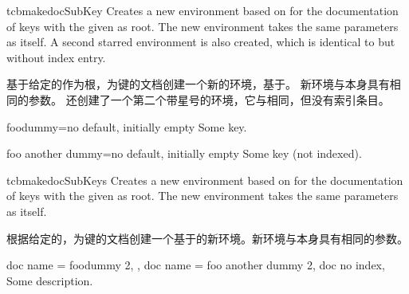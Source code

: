 \begin{docCommand}[doc updated=2020-04-22]{tcbmakedocSubKey}{}
Creates a new environment  based on  for the
documentation of keys with the given  as root.
The new environment  takes the same para\-meters as  itself.
A second starred environment  is also created, which is identical
to  but without index entry.

基于给定的作为根，为键的文档创建一个新的环境，基于。 新环境与本身具有相同的参数。 还创建了一个第二个带星号的环境，它与相同，但没有索引条目。
\begin{dispExample}

\begin{docFooKey}{foodummy}{=}{no default, initially empty}
Some key.
\end{docFooKey}

\begin{docFooKey*}{foo another dummy}{=}{no default, initially empty}
Some key (not indexed).
\end{docFooKey*}
\end{dispExample}
\end{docCommand}


\begin{docCommand}[doc new=2020-04-22]{tcbmakedocSubKeys}{}
Creates a new environment  based on  for the
documentation of keys with the given  as root.
The new environment  takes the same para\-meters as  itself.

根据给定的，为键的文档创建一个基于的新环境。新环境与本身具有相同的参数。
\begin{dispExample}

\begin{docFooKeys}[
  doc parameter   = {=\meta{nothing}},
  doc description = {no default, initially empty},
]
{
  {
    doc name = foodummy 2,
  },
  {
    doc name = foo another dummy 2,
    doc no index,
  }
}
Some description.
\end{docFooKeys}
\end{dispExample}
\end{docCommand}